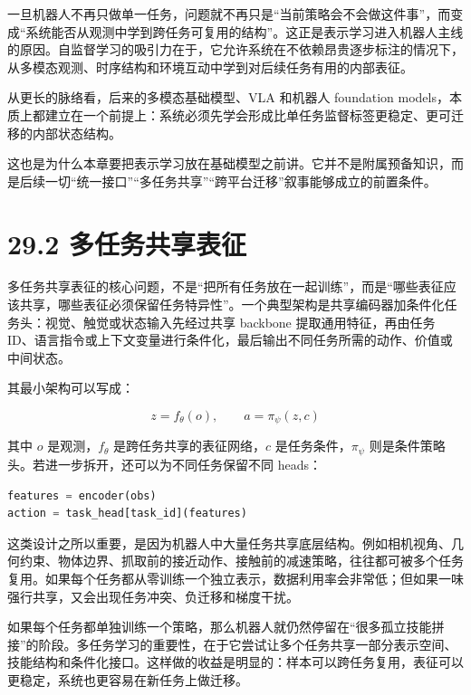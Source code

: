 一旦机器人不再只做单一任务，问题就不再只是“当前策略会不会做这件事”，而变成“系统能否从观测中学到跨任务可复用的结构”。这正是表示学习进入机器人主线的原因。自监督学习的吸引力在于，它允许系统在不依赖昂贵逐步标注的情况下，从多模态观测、时序结构和环境互动中学到对后续任务有用的内部表征。

从更长的脉络看，后来的多模态基础模型、VLA 和机器人 foundation models，本质上都建立在一个前提上：系统必须先学会形成比单任务监督标签更稳定、更可迁移的内部状态结构。

这也是为什么本章要把表示学习放在基础模型之前讲。它并不是附属预备知识，而是后续一切“统一接口”“多任务共享”“跨平台迁移”叙事能够成立的前置条件。

\section*{29.2 多任务共享表征}


多任务共享表征的核心问题，不是“把所有任务放在一起训练”，而是“哪些表征应该共享，哪些表征必须保留任务特异性”。一个典型架构是共享编码器加条件化任务头：视觉、触觉或状态输入先经过共享 backbone 提取通用特征，再由任务 ID、语言指令或上下文变量进行条件化，最后输出不同任务所需的动作、价值或中间状态。

其最小架构可以写成：

\begin{equation*}
z = f_\theta(o), \qquad a = \pi_\psi(z, c)
\end{equation*}

其中 \(o\) 是观测，\(f_\theta\) 是跨任务共享的表征网络，\(c\) 是任务条件，\(\pi_\psi\) 则是条件策略头。若进一步拆开，还可以为不同任务保留不同 heads：

\begin{lstlisting}[language=python]
features = encoder(obs)
action = task_head[task_id](features)
\end{lstlisting}

这类设计之所以重要，是因为机器人中大量任务共享底层结构。例如相机视角、几何约束、物体边界、抓取前的接近动作、接触前的减速策略，往往都可被多个任务复用。如果每个任务都从零训练一个独立表示，数据利用率会非常低；但如果一味强行共享，又会出现任务冲突、负迁移和梯度干扰。

如果每个任务都单独训练一个策略，那么机器人就仍然停留在“很多孤立技能拼接”的阶段。多任务学习的重要性，在于它尝试让多个任务共享一部分表示空间、技能结构和条件化接口。这样做的收益是明显的：样本可以跨任务复用，表征可以更稳定，系统也更容易在新任务上做迁移。

